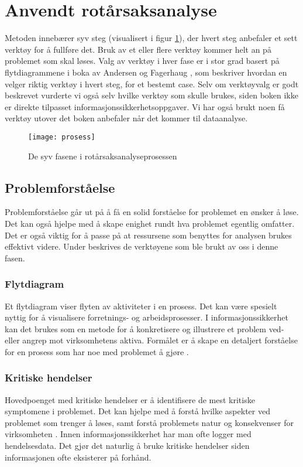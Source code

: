 \section{Anvendt rotårsaksanalyse}
Metoden innebærer syv steg (visualisert i figur \ref{fig:prosess}), der hvert steg anbefaler et sett verktøy for å fullføre det. Bruk av et eller flere verktøy kommer helt an på problemet som skal løses. Valg av verktøy i hver fase er i stor grad basert på flytdiagrammene i boka av Andersen og Fagerhaug \cite{RCA}, som beskriver hvordan en velger riktig verktøy i hvert steg, for et bestemt case. Selv om verktøyvalg er godt beskrevet vurderte vi også selv hvilke verktøy som skulle brukes, siden boken ikke er direkte tilpasset informasjonssikkerhetsoppgaver. Vi har også brukt noen få verktøy utover det boken anbefaler når det kommer til dataanalyse. 

\begin{figure}[H]
    \centering
    \texttt{[image: prosess]}
    \caption[RCA-prosess]{De syv fasene i rotårsaksanalyseprosessen}
    \label{fig:prosess}
\end{figure}

\subsection{Problemforståelse}
Problemforståelse går ut på å få en solid forståelse for problemet en ønsker å løse. Det kan også hjelpe med å skape enighet rundt hva problemet egentlig omfatter. Det er også viktig for å passe på at ressursene som benyttes for analysen brukes effektivt videre. Under beskrives de verktøyene som ble brukt av oss i denne fasen. 

\subsubsection{Flytdiagram}
Et flytdiagram viser flyten av aktiviteter i en prosess. Det kan være spesielt nyttig for å visualisere forretnings- og arbeidsprosesser. I informasjonssikkerhet kan det brukes som en metode for å konkretisere og illustrere et problem ved- eller angrep mot virksomhetens aktiva. Formålet er å skape en detaljert forståelse for en prosess som har noe med problemet å gjøre \cite{RCA}.

\subsubsection{Kritiske hendelser}
Hovedpoenget med kritiske hendelser er å identifisere de mest kritiske symptomene i problemet. Det kan hjelpe med å forstå hvilke aspekter ved problemet som trenger å løses, samt forstå problemets natur og konsekvenser for virksomheten \cite{RCA}. Innen informasjonssikkerhet har man ofte logger med hendelsesdata. Det gjør det naturlig å bruke kritiske hendelser siden informasjonen ofte eksisterer på forhånd. 

